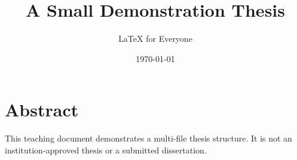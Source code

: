 \documentclass[11pt,oneside]{book}
\title{A Small Demonstration Thesis}
\author{LaTeX for Everyone}
\date{\today}
\begin{document}
\frontmatter
\maketitle
\chapter*{Abstract}
This teaching document demonstrates a multi-file thesis structure.
It is not an institution-approved thesis or a submitted dissertation.
\tableofcontents

\mainmatter




\backmatter
\printbibliography[heading=bibintoc]
\end{document}
